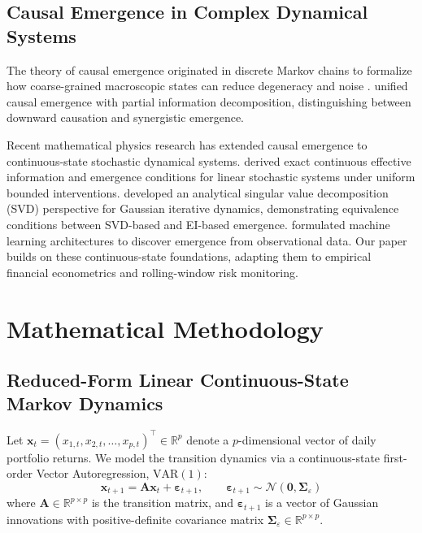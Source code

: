 \documentclass[review,12pt,authoryear]{elsarticle}
\begin{document}
\subsection{Causal Emergence in Complex Dynamical Systems}
The theory of causal emergence originated in discrete Markov chains to formalize how coarse-grained macroscopic states can reduce degeneracy and noise \citep{hoel2013quantifying, hoel2017when, klein2020emergence}. \citet{rosas2020reconciling} unified causal emergence with partial information decomposition, distinguishing between downward causation and synergistic emergence.

Recent mathematical physics research has extended causal emergence to continuous-state stochastic dynamical systems. \citet{liu2024exact} derived exact continuous effective information and emergence conditions for linear stochastic systems under uniform bounded interventions. \citet{liu2025singular} developed an analytical singular value decomposition (SVD) perspective for Gaussian iterative dynamics, demonstrating equivalence conditions between SVD-based and EI-based emergence. \citet{yang2025finding} formulated machine learning architectures to discover emergence from observational data. Our paper builds on these continuous-state foundations, adapting them to empirical financial econometrics and rolling-window risk monitoring.

\section{Mathematical Methodology}
\label{sec:methodology}

\subsection{Reduced-Form Linear Continuous-State Markov Dynamics}
Let $\mathbf{x}_t = (x_{1,t}, x_{2,t}, \dots, x_{p,t})^\top \in \mathbb{R}^p$ denote a $p$-dimensional vector of daily portfolio returns. We model the transition dynamics via a continuous-state first-order Vector Autoregression, $\text{VAR}(1)$:
\begin{equation}
\mathbf{x}_{t+1} = \mathbf{A}\mathbf{x}_t + \boldsymbol{\varepsilon}_{t+1}, \qquad \boldsymbol{\varepsilon}_{t+1} \sim \mathcal{N}(\mathbf{0}, \boldsymbol{\Sigma}_\varepsilon)
\label{eq:var1_model}
\end{equation}
where $\mathbf{A} \in \mathbb{R}^{p \times p}$ is the transition matrix, and $\boldsymbol{\varepsilon}_{t+1}$ is a vector of Gaussian innovations with positive-definite covariance matrix $\boldsymbol{\Sigma}_\varepsilon \in \mathbb{R}^{p \times p}$. 
\end{document}
